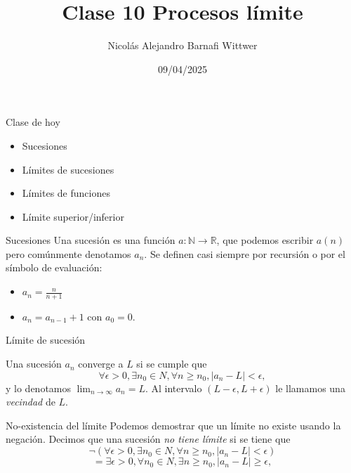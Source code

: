 \documentclass[14pt,aspectratio=169,xcolor=dvipsnames]{beamer}
\title[short title]{Clase 10 Procesos límite}
\subtitle{}
\author[NA Barnafi] {Nicolás Alejandro Barnafi Wittwer}
\institute[UC|CMM] 
{
    Pontificia Universidad Católica de Chile \\
    Centro de Modelamiento Matemático
}
\date{09/04/2025}
\newcommand{\R}{\mathbb{R}}
\begin{document}
\begin{frame}
    \maketitle
\end{frame}
\begin{frame}{Clase de hoy}
    \begin{itemize}
        \item Sucesiones
        \item Límites de sucesiones
        \item Límites de funciones
        \item Límite superior/inferior
    \end{itemize}

    \vspace{1cm}
\end{frame}
\begin{frame}{Sucesiones}
    Una sucesión es una función $a:\mathbb N\to \R$, que podemos escribir $a(n)$ pero comúnmente denotamos $a_n$. Se definen casi siempre por recursión o por el símbolo de evaluación:
    \begin{itemize}
        \item $a_n = \frac{n}{n+1}$
        \item $a_n = a_{n-1} + 1$ con $a_0 = 0$. 
    \end{itemize}
\end{frame}
\begin{frame}{Límite de sucesión}
    \begin{block}{}
        Una sucesión $a_n$ converge a $L$ si se cumple que
            $$ \forall \epsilon > 0, \exists n_0\in N, \forall n\geq n_0, |a_n - L | < \epsilon, $$
            y lo denotamos $\lim_{n\to\infty} a_n = L$. Al intervalo $(L-\epsilon, L+\epsilon)$ le llamamos una \emph{vecindad} de $L$.
    \end{block}
\end{frame}
\begin{frame}{No-existencia del límite}
    Podemos demostrar que un límite no existe usando la negación. Decimos que una sucesión \emph{no tiene límite} si se tiene que
            $$ \neg(\forall \epsilon > 0, \exists n_0\in N, \forall n\geq n_0, |a_n - L | < \epsilon) $$
            $$ =\exists \epsilon > 0, \forall n_0\in N, \exists n\geq n_0, |a_n - L | \geq \epsilon, $$
\end{frame}
\end{document}
